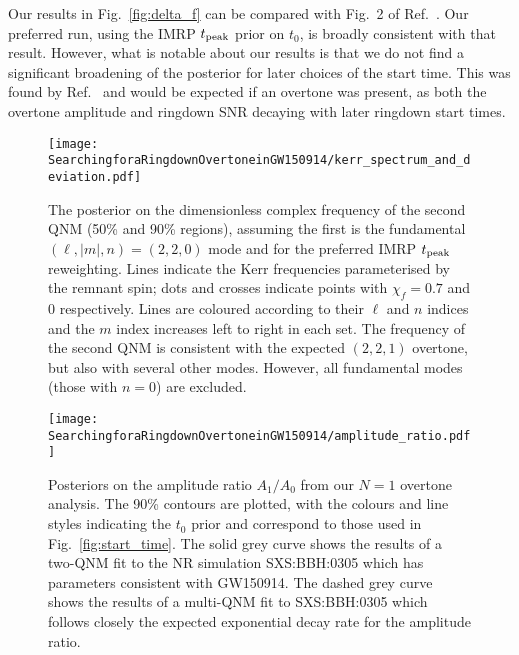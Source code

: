 Our results in Fig.~\ref{fig:delta_f} can be compared with Fig.~2 of Ref.~\cite{Isi:2022mhy}. 
Our preferred run, using the IMRP $t_{\rm peak}$ prior on $t_0$, is broadly consistent with that result.
However, what is notable about our results is that we do not find a significant broadening of the posterior for later choices of the start time. 
This was found by Ref.~\cite{Isi:2022mhy} and would be expected if an overtone was present, as both the overtone amplitude and ringdown SNR decaying with later ringdown start times.

\begin{figure}
    \centering
    \texttt{[image: SearchingforaRingdownOvertoneinGW150914/kerr\_spectrum\_and\_deviation.pdf]}
    \caption[Posterior on the complex frequency of the second GW150914 quasinormal mode assuming the first is associated with the fundamental mode]{ 
    The posterior on the dimensionless complex frequency of the second QNM (50\% and 90\% regions), assuming the first is the fundamental $(\ell,|m|,n)=(2,2,0)$ mode and for the preferred IMRP $t_{\rm peak}$ reweighting.
    Lines indicate the Kerr frequencies parameterised by the remnant spin; dots and crosses indicate points with $\chi_f=0.7$ and $0$ respectively.
    Lines are coloured according to their $\ell$ and $n$ indices and the $m$ index increases left to right in each set.
    The frequency of the second QNM is consistent with the expected $(2,2,1)$ overtone, but also with several other modes.
    However, all fundamental modes (those with $n=0$) are excluded.
    }
    \label{fig:other_QNMs}
\end{figure}

\begin{figure}[t]
    \centering
    \texttt{[image: SearchingforaRingdownOvertoneinGW150914/amplitude\_ratio.pdf]}
    \caption[Posteriors on the GW150914 overtone amplitude divided by the fundamental-mode amplitude, for different choices of the ringdown start-time prior]{ 
    Posteriors on the amplitude ratio $A_1/A_0$ from our $N=1$ overtone analysis. 
    The 90\% contours are plotted, with the colours and line styles indicating the $t_0$ prior and correspond to those used in Fig.~\ref{fig:start_time}.
    The solid grey curve shows the results of a two-QNM fit to the NR simulation SXS:BBH:0305 which has parameters consistent with GW150914.
    The dashed grey curve shows the results of a multi-QNM fit to SXS:BBH:0305 which follows closely the expected exponential decay rate for the amplitude ratio.
    }
    \label{fig:amp_ratio}
\end{figure}

